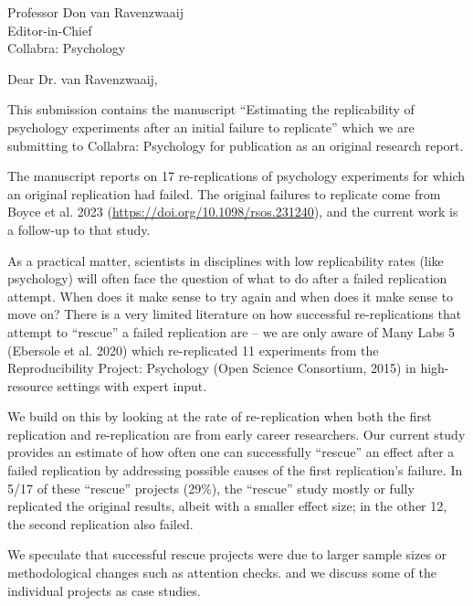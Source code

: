 \documentclass{stanfordletter}
\begin{document}
	\signature{\vspace{-35pt} Veronica Boyce, \\ on behalf of the author team}
	
	
	\begin{letter}{Professor Don van Ravenzwaaij \\ Editor-in-Chief \\ Collabra: Psychology }
		
		
          \opening{Dear Dr. van Ravenzwaaij,} 
          This submission contains the manuscript ``Estimating the replicability of psychology experiments after an initial failure to replicate'' which we are submitting to Collabra: Psychology for publication as an original research report.
          
          The manuscript reports on 17 re-replications of psychology experiments for which an original replication had failed.  The original failures to replicate come from Boyce et al. 2023 (\url{https://doi.org/10.1098/rsos.231240}), and the current work is a follow-up to that study.  
          
          As a practical matter, scientists in disciplines with low replicability rates (like psychology) will often face the question of what to do after a failed replication attempt. When does it make sense to try again and when does it make sense to move on? There is a very limited literature on how successful re-replications that attempt to ``rescue'' a failed replication are -- we are only aware of Many Labs 5 (Ebersole et al. 2020) which re-replicated 11 experiments from the Reproducibility Project: Psychology (Open Science Consortium, 2015) in high-resource settings with expert input. 
          
          We build on this by looking at the rate of re-replication when both the first replication and re-replication are from early career researchers. Our current study provides an estimate of how often one can successfully ``rescue'' an effect after a failed replication by addressing possible causes of the first replication's failure. In 5/17 of these ``rescue'' projects (29\%), the ``rescue'' study mostly or fully replicated the original results, albeit with a smaller effect size; in the other 12, the second replication also failed.
          
          We speculate that successful rescue projects were due to larger sample sizes or methodological changes such as attention checks. and we discuss some of the individual projects as case studies. 
           

\end{letter}
\end{document}
